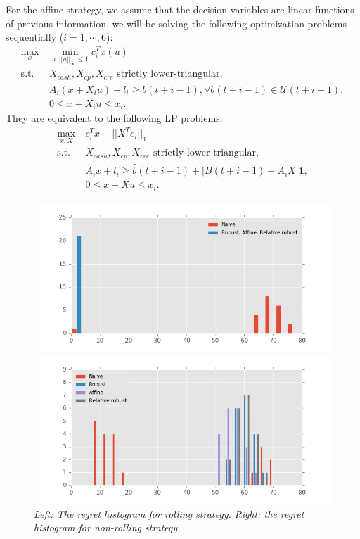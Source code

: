 \documentclass{article}
\begin{document}
    For the affine strategy, we assume that the decision variables are linear functions of previous information. we will be solving the following optimization problems sequentially ($i = 1, \cdots, 6$):
    \[\begin{split}
       \max_x\ & \min_{u:||u||_\infty \leq 1} c_i^Tx(u) \\
        \text{s.t. } & X_{cash},  X_{cp}, X_{cre} \text{ strictly lower-triangular,}\\
        & A_i(x + X_iu) + l_i\geq b(t+i-1),\forall b(t+i-1) \in \mathcal{U}(t+i-1) ,\\
        & 0\leq x+X_iu \leq \bar{x}_i.
    \end{split}\]
    They are equivalent to the following LP problems:
    \[\begin{split}
       \max_{x, X}\ & c_i^Tx - ||X^Tc_i||_1  \\
        \text{s.t. } & X_{cash},  X_{cp}, X_{cre} \text{ strictly lower-triangular,}\\
        & A_ix + l_i\geq  \hat{b}(t+i-1) + |B(t+i-1) - A_iX|\textbf{1}, \\
        & 0\leq x+Xu \leq \bar{x}_i.
    \end{split}\]   

    \begin{figure}
        \label{fig:regret}
        \begin{minipage}{0.5\textwidth}
            \centering  
            \includegraphics[width=\textwidth]{rolling_regret.png}
        \end{minipage}
        \begin{minipage}{0.5\textwidth}
            \centering  
            \includegraphics[width=\textwidth]{regret.png}
        \end{minipage}
        \caption{\emph{Left: The regret histogram for rolling strategy. Right: the regret histogram for non-rolling strategy.}}
    \end{figure}
\end{document}
